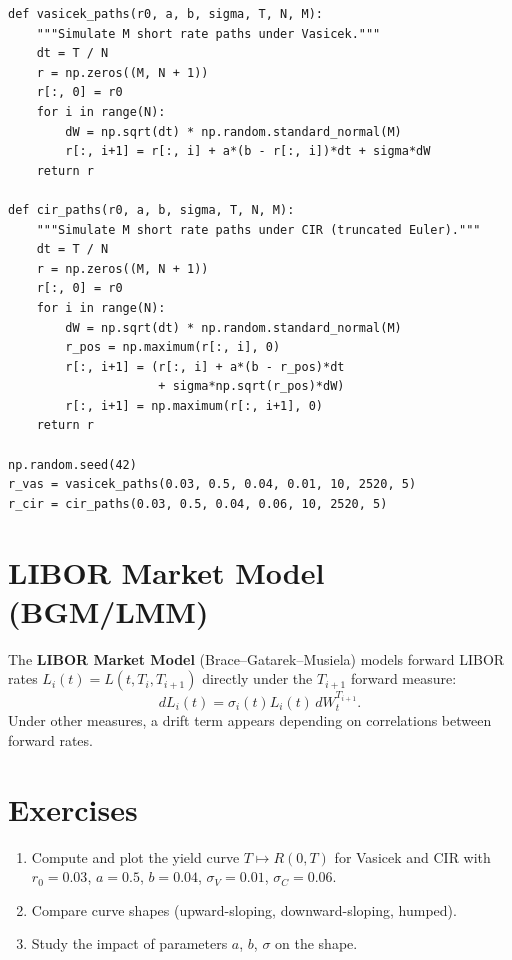 \begin{codeblock}[title=\textbf{Short Rate Path Simulation (Vasicek)}]
\begin{verbatim}
def vasicek_paths(r0, a, b, sigma, T, N, M):
    """Simulate M short rate paths under Vasicek."""
    dt = T / N
    r = np.zeros((M, N + 1))
    r[:, 0] = r0
    for i in range(N):
        dW = np.sqrt(dt) * np.random.standard_normal(M)
        r[:, i+1] = r[:, i] + a*(b - r[:, i])*dt + sigma*dW
    return r

def cir_paths(r0, a, b, sigma, T, N, M):
    """Simulate M short rate paths under CIR (truncated Euler)."""
    dt = T / N
    r = np.zeros((M, N + 1))
    r[:, 0] = r0
    for i in range(N):
        dW = np.sqrt(dt) * np.random.standard_normal(M)
        r_pos = np.maximum(r[:, i], 0)
        r[:, i+1] = (r[:, i] + a*(b - r_pos)*dt
                     + sigma*np.sqrt(r_pos)*dW)
        r[:, i+1] = np.maximum(r[:, i+1], 0)
    return r

np.random.seed(42)
r_vas = vasicek_paths(0.03, 0.5, 0.04, 0.01, 10, 2520, 5)
r_cir = cir_paths(0.03, 0.5, 0.04, 0.06, 10, 2520, 5)
\end{verbatim}
\end{codeblock}

\section{LIBOR Market Model (BGM/LMM)}

\begin{definition}
The \textbf{LIBOR Market Model} (Brace--Gatarek--Musiela) models forward
LIBOR rates $L_i(t) = L(t, T_i, T_{i+1})$ directly under the $T_{i+1}$
forward measure:
\[
    dL_i(t) = \sigma_i(t)L_i(t)\,dW_t^{T_{i+1}}.
\]
Under other measures, a drift term appears depending on correlations
between forward rates.
\end{definition}

\section{Exercises}

\begin{exercise}
\begin{enumerate}
    \item Compute and plot the yield curve $T \mapsto R(0,T)$ for Vasicek
          and CIR with $r_0 = 0.03$, $a = 0.5$, $b = 0.04$,
          $\sigma_V = 0.01$, $\sigma_C = 0.06$.
    \item Compare curve shapes (upward-sloping, downward-sloping, humped).
    \item Study the impact of parameters $a$, $b$, $\sigma$ on the shape.
\end{enumerate}
\end{exercise}

